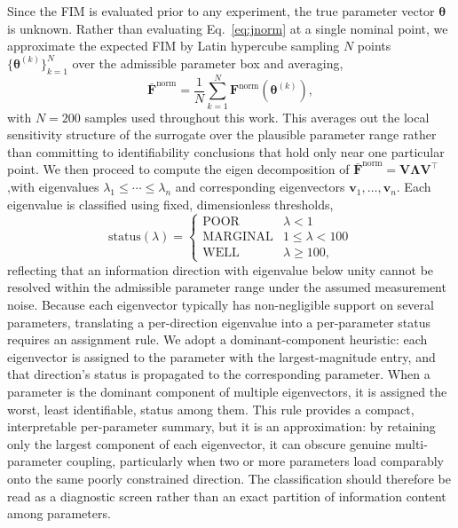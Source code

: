 \documentclass[preprint,review,10pt,number]{elsarticle}
\begin{document}
Since the FIM is evaluated prior to any experiment, the true parameter vector $\boldsymbol{\theta}$ is unknown. 
Rather than evaluating Eq.~\eqref{eq:jnorm} at a single nominal point, we approximate the expected FIM by Latin hypercube sampling $N$ points $\{\boldsymbol{\theta}^{(k)}\}_{k=1}^N$ over the admissible parameter box and averaging,
%
\begin{equation}
    \bar{\mathbf{F}}^{\text{norm}} = \frac{1}{N} \sum_{k=1}^{N} \mathbf{F}^{\text{norm}}(\boldsymbol{\theta}^{(k)}),
    \label{eq:fim_expected}
\end{equation}
%
with $N = 200$ samples used throughout this work. 
This averages out the local
sensitivity structure of the surrogate over the plausible parameter range rather than committing to identifiability conclusions that hold only near one particular point.
We then proceed to compute the eigen decomposition of $\bar{\mathbf{F}}^{\text{norm}} = \mathbf{V}\boldsymbol{\Lambda}\mathbf{V}^\top$,with eigenvalues $\lambda_1 \leq \cdots \leq \lambda_{n}$ and corresponding eigenvectors
$\mathbf{v}_1, \ldots, \mathbf{v}_n$. Each eigenvalue is classified using fixed,
dimensionless thresholds,
%
\begin{equation}
    \text{status}(\lambda) =
    \begin{cases}
        \text{POOR} & \lambda < 1 \\
        \text{MARGINAL} & 1 \leq \lambda < 100 \\
        \text{WELL} & \lambda \geq 100,
    \end{cases}
    \label{eq:eig_thresholds}
\end{equation}
%
reflecting that an information direction with eigenvalue below unity cannot be resolved within the admissible parameter range under the assumed measurement noise. 
Because each eigenvector typically has non-negligible support on several parameters, translating a per-direction eigenvalue into a per-parameter status requires an assignment rule. 
We adopt a dominant-component heuristic: each eigenvector is assigned to the parameter with the largest-magnitude entry, and that direction's status is propagated to the corresponding parameter. 
When a parameter is the dominant component of multiple eigenvectors, it is assigned the worst, least identifiable, status among them. This rule provides a compact, interpretable per-parameter summary, but it is an approximation: by retaining only the largest component of each eigenvector, it can obscure genuine multi-parameter coupling, particularly when two or more parameters load comparably onto the same poorly constrained direction. The classification should therefore be read as a diagnostic screen rather than an exact partition of information content among parameters.
\end{document}
